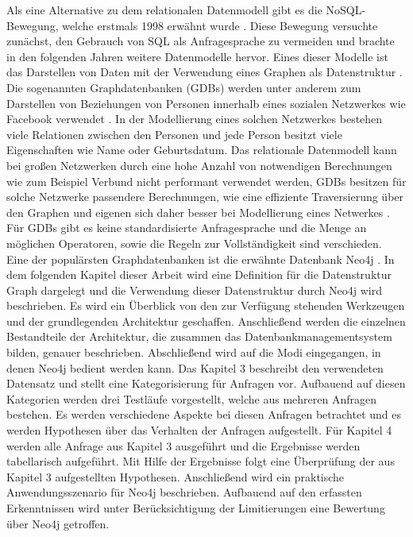 Als eine Alternative zu dem relationalen Datenmodell gibt es die NoSQL-Bewegung, welche erstmals 1998 erwähnt wurde \parencite{NoSQL}. Diese Bewegung versuchte zunächst, den Gebrauch von SQL als Anfragesprache zu vermeiden und brachte in den folgenden Jahren weitere Datenmodelle hervor. Eines dieser Modelle ist das Darstellen von Daten mit der Verwendung eines Graphen als Datenstruktur \parencite{miller2013graph}. Die sogenannten Graphdatenbanken (GDBs) werden unter anderem zum Darstellen von Beziehungen von Personen innerhalb eines sozialen Netzwerkes wie Facebook verwendet \parencite{han2011survey}. In der Modellierung eines solchen Netzwerkes bestehen viele Relationen zwischen den Personen und jede Person besitzt viele Eigenschaften wie Name oder Geburtsdatum. Das relationale Datenmodell kann bei großen Netzwerken durch eine hohe Anzahl von notwendigen Berechnungen wie zum Beispiel Verbund nicht performant verwendet werden, GDBs besitzen für solche Netzwerke passendere Berechnungen, wie eine effiziente Traversierung über den Graphen und eigenen sich daher besser bei Modellierung eines Netwerkes \parencite{miller2013graph}. Für GDBs gibt es keine standardisierte Anfragesprache und  die Menge an möglichen Operatoren, sowie die Regeln zur Vollständigkeit sind verschieden.
Eine der populärsten Graphdatenbanken ist die erwähnte Datenbank Neo4j \parencite{francis2018cypher}.  \newline 
In dem folgenden Kapitel dieser Arbeit wird eine Definition für die Datenstruktur Graph dargelegt und die Verwendung dieser Datenstruktur durch Neo4j wird beschrieben. Es wird ein Überblick von den zur Verfügung stehenden Werkzeugen und der grundlegenden Architektur geschaffen. Anschließend werden die einzelnen Bestandteile der Architektur, die zusammen das Datenbankmanagementsystem bilden, genauer beschrieben. Abschließend wird auf die Modi eingegangen, in denen Neo4j bedient werden
kann. \newline
Das Kapitel 3 beschreibt den verwendeten Datensatz und stellt eine Kategorisierung
für Anfragen vor. Aufbauend auf diesen Kategorien werden drei Testläufe vorgestellt, welche aus mehreren Anfragen bestehen. Es werden verschiedene Aspekte
bei diesen Anfragen betrachtet und es werden Hypothesen über das Verhalten der
Anfragen aufgestellt. \newline
Für Kapitel 4 werden alle Anfrage aus Kapitel 3 ausgeführt und die Ergebnisse werden tabellarisch aufgeführt. Mit Hilfe der Ergebnisse folgt eine Überprüfung der
aus Kapitel 3 aufgestellten Hypothesen. Anschließend wird ein praktische Anwendungsszenario für Neo4j beschrieben. Aufbauend auf den erfassten Erkenntnissen
wird unter Berücksichtigung der Limitierungen eine Bewertung über Neo4j getroffen.

